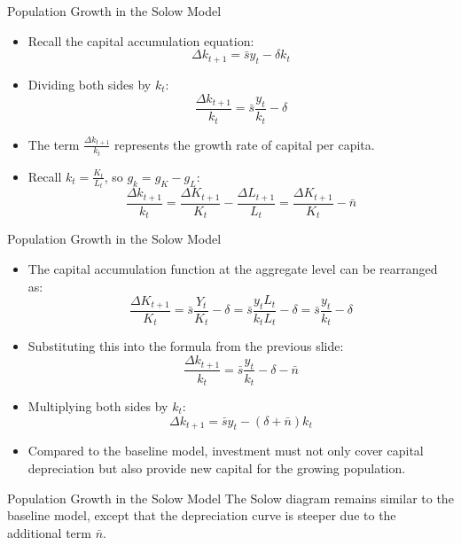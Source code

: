 \documentclass[aspectratio=1610]{beamer}
\begin{document}
\begin{frame}[wide]{Population Growth in the Solow Model}
	\begin{itemize}
		\item Recall the capital accumulation equation:
		\[
		\Delta k_{t+1} = \bar{s} y_t - \delta k_t
		\]
		\item Dividing both sides by \(k_t\):
		\[
		\frac{\Delta k_{t+1}}{k_t} = \bar{s} \frac{y_t}{k_t} - \delta
		\]
		\item The term \(\frac{\Delta k_{t+1}}{k_t}\) represents the growth rate of capital per capita.
		\item Recall \(k_t = \frac{K_t}{L_t}\), so \(g_k = g_K - g_L\):
		\[
		\frac{\Delta k_{t+1}}{k_t} = \frac{\Delta K_{t+1}}{K_t} - \frac{\Delta L_{t+1}}{L_t} = \frac{\Delta K_{t+1}}{K_t} - \bar{n}
		\]
	\end{itemize}
\end{frame}

\begin{frame}[wide]{Population Growth in the Solow Model}
	\begin{itemize}
		\item The capital accumulation function at the aggregate level can be rearranged as:
		\[
		\frac{\Delta K_{t+1}}{K_t} = \bar{s} \frac{Y_t}{K_t} - \delta = \bar{s} \frac{y_t L_t}{k_t L_t} - \delta = \bar{s} \frac{y_t}{k_t} - \delta
		\]
		\item Substituting this into the formula from the previous slide:
		\[
		\frac{\Delta k_{t+1}}{k_t} = \bar{s} \frac{y_t}{k_t} - \delta - \bar{n}
		\]
		\item Multiplying both sides by \(k_t\):
		\[
		\Delta k_{t+1} = \bar{s} y_t - (\delta + \bar{n}) k_t
		\]
		\item Compared to the baseline model, investment must not only cover capital depreciation but also provide new capital for the growing population.
	\end{itemize}
\end{frame}

\begin{frame}[wide]{Population Growth in the Solow Model}
	The Solow diagram remains similar to the baseline model, except that the depreciation curve is steeper due to the additional term \(\bar{n}\).
	\begin{figure}
		\centering
	\end{figure}
\end{frame}
\end{document}
